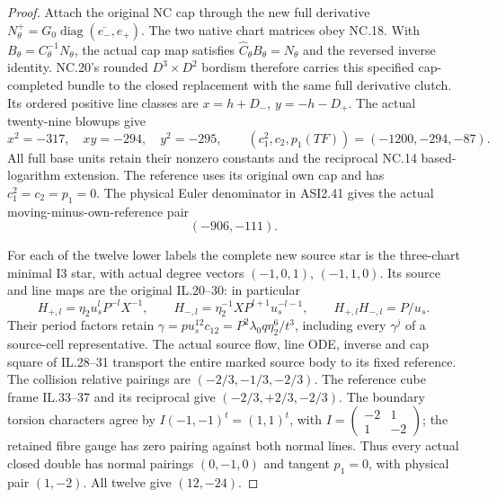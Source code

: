 \begin{proof}
Attach the original NC cap through the new full derivative
\(N^+_\theta=G_0\operatorname{diag}(\overline{e_-},e_+)\).
The two native chart matrices obey NC.18.  With
\(B_\theta=C_\theta^{-1}N_\theta\), the actual cap map satisfies
\(\widehat C_\theta B_\theta=N_\theta\) and the reversed inverse
identity.  NC.20's rounded \(D^3\times D^2\) bordism therefore carries
this specified cap-completed bundle to the closed replacement with the
same full derivative clutch.  Its ordered positive line classes are
\(x=h+D_-\), \(y=-h-D_+\).  The actual twenty-nine blowups give
\[
x^2=-317,\quad xy=-294,\quad y^2=-295,
\qquad(c_1^2,c_2,p_1(TF))=(-1200,-294,-87).
\]
All full base units retain their nonzero constants and the reciprocal
NC.14 based-logarithm extension.  The reference uses its original own
cap and has \(c_1^2=c_2=p_1=0\).  The physical Euler denominator in
ASI2.41 gives the actual moving-minus-own-reference pair
\[
                              (-906,-111).
\]

For each of the twelve lower labels the complete new source star is the
three-chart minimal I3 star, with actual degree vectors
\((-1,0,1)\), \((-1,1,0)\).  Its source and line maps are the original
IL.20--30: in particular
\[
H_{+,l}=\eta_2u_s^lP^{-l}X^{-1},\qquad
H_{-,l}=\eta_2^{-1}XP^{l+1}u_s^{-l-1},\qquad
H_{+,l}H_{-,l}=P/u_s.
\]
Their period factors retain
\(\gamma=pu_s^{12}c_{12}=P^2\lambda_0q\eta_2^6/t^3\), including every
\(\gamma^j\) of a source-cell representative.  The actual source flow,
line ODE, inverse and cap square of IL.28--31 transport the entire marked
source body to its fixed reference.  The collision relative pairings are
\((-2/3,-1/3,-2/3)\).  The reference cube frame IL.33--37 and its
reciprocal give \((-2/3,+2/3,-2/3)\).  The boundary torsion characters
agree by \(I(-1,-1)^t=(1,1)^t\), with
\(I=\left(\begin{smallmatrix}-2&1\\1&-2\end{smallmatrix}\right)\);
the retained fibre gauge has zero pairing
against both normal lines.  Thus every actual closed double has normal
pairings \((0,-1,0)\) and tangent \(p_1=0\), with physical pair
\((1,-2)\).  All twelve give \((12,-24)\).


\end{proof}
